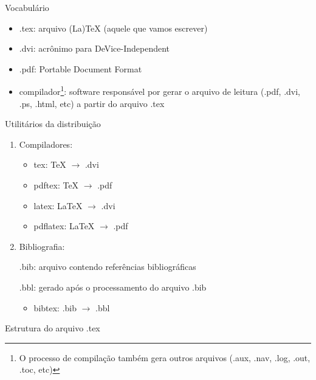 \documentclass{beamer}
\begin{document}
\begin{frame}{Vocabul\'ario}
    \begin{itemize}
        \item .tex: arquivo (La)TeX (aquele que vamos escrever)
        \item .dvi: acr\^onimo para DeVice-Independent
        \item .pdf: Portable Document Format
        \item compilador\footnote{O processo de compila\c{c}\~ao tamb\'em gera outros
        arquivos (.aux, .nav, .log, .out, .toc, etc)}: software respons\'avel por
        gerar o arquivo de leitura (.pdf, .dvi, .ps, .html, etc) a partir do
        arquivo .tex
    \end{itemize}
\end{frame}

\begin{frame}{Utilit\'arios da distribui\c{c}\~ao}
    \begin{enumerate}
        \item Compiladores:
            \begin{itemize}
                \item tex: TeX $\rightarrow$ .dvi
                \item pdftex: TeX $\rightarrow$ .pdf
                \item latex: LaTeX $\rightarrow$ .dvi
                \item pdflatex: LaTeX $\rightarrow$ .pdf
            \end{itemize}
        \pause 
        \item Bibliografia:

            .bib: arquivo contendo refer\^encias bibliogr\'aficas

            .bbl: gerado ap\'os o processamento do arquivo .bib
            \begin{itemize}
                \item bibtex: .bib $\rightarrow$ .bbl
            \end{itemize}
    \end{enumerate}
\end{frame}

\begin{frame}[fragile]{Estrutura do arquivo .tex}
    
\end{frame}
\end{document}
